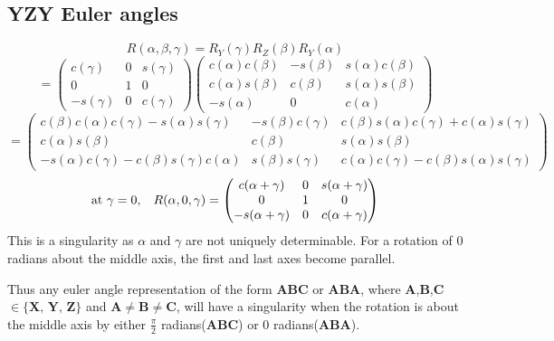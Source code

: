 \documentclass[11pt]{article}
\begin{document}
\subsection*{YZY Euler angles}
\begin{equation*}
    R(\alpha, \beta, \gamma) = R_Y(\gamma) R_Z(\beta) R_Y(\alpha)
\end{equation*}
\begin{equation*}
    = \begin{pmatrix}
        c(\gamma) & 0 & s(\gamma) \\
        0 & 1 & 0 \\
        -s(\gamma) & 0 & c(\gamma)
    \end{pmatrix}
    \begin{pmatrix}
        c(\alpha)c(\beta) & -s(\beta) & s(\alpha)c(\beta) \\ 
        c(\alpha)s(\beta) & c(\beta) & s(\alpha)s(\beta) \\
        -s(\alpha) & 0 & c(\alpha)
    \end{pmatrix}
\end{equation*}
\begin{equation*}
    =
    \begin{pmatrix}
        c(\beta)c(\alpha)c(\gamma) - s(\alpha)s(\gamma) & -s(\beta)c(\gamma) & c(\beta)s(\alpha)c(\gamma) + c(\alpha)s(\gamma) \\
        c(\alpha)s(\beta) & c(\beta) & s(\alpha)s(\beta) \\
        -s(\alpha)c(\gamma)-c(\beta)s(\gamma)c(\alpha) & s(\beta)s(\gamma) & c(\alpha)c(\gamma) - c(\beta)s(\alpha)s(\gamma)
    \end{pmatrix}
\end{equation*}
\begin{equation*}
    \text{at } \gamma = 0, \hspace{3mm} R(\alpha, 0, \gamma) =
    \begin{pmatrix}
        c(\alpha + \gamma) & 0 & s(\alpha + \gamma) \\
        0 & 1 & 0 \\
        -s(\alpha + \gamma) & 0 & c(\alpha + \gamma)
    \end{pmatrix}
\end{equation*}
This is a singularity as $\alpha$ and $\gamma$ are not uniquely determinable. For a rotation of 0 radians about the middle axis, the first and last axes become parallel.

Thus any euler angle representation of the form \textbf{ABC} or \textbf{ABA}, where \textbf{A},\textbf{B},\textbf{C} $\in \{\textbf{X, Y, Z}\}$ and $\textbf{A} \neq \textbf{B} \neq \textbf{C}$, will have a singularity
when the rotation is about the middle axis by either $\frac{\pi}{2}$ radians(\textbf{ABC}) or 0 radians(\textbf{ABA}).
\end{document}
